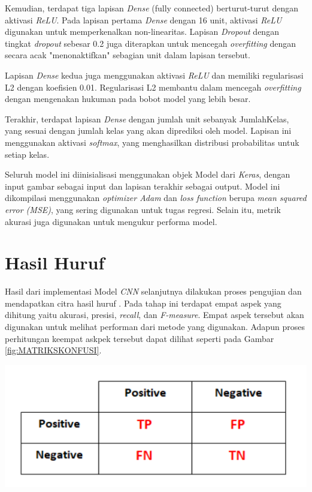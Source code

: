 Kemudian, terdapat tiga lapisan \textit{Dense} (fully connected) berturut-turut dengan aktivasi \textit{ReLU}. Pada lapisan pertama \textit{Dense} dengan 16 unit, aktivasi \textit{ReLU} digunakan untuk memperkenalkan non-linearitas. Lapisan \textit{Dropout} dengan tingkat \textit{dropout} sebesar 0.2 juga diterapkan untuk mencegah \textit{overfitting} dengan secara acak "menonaktifkan" sebagian unit dalam lapisan tersebut.

Lapisan \textit{Dense} kedua juga menggunakan aktivasi \textit{ReLU} dan memiliki regularisasi L2 dengan koefisien 0.01. Regularisasi L2 membantu dalam mencegah \textit{overfitting} dengan mengenakan hukuman pada bobot model yang lebih besar.

Terakhir, terdapat lapisan \textit{Dense} dengan jumlah unit sebanyak JumlahKelas, yang sesuai dengan jumlah kelas yang akan diprediksi oleh model. Lapisan ini menggunakan aktivasi \textit{softmax}, yang menghasilkan distribusi probabilitas untuk setiap kelas.

Seluruh model ini diinisialisasi menggunakan objek Model dari \textit{Keras}, dengan input gambar sebagai input dan lapisan terakhir sebagai output. Model ini dikompilasi menggunakan \textit{optimizer Adam} dan \textit{loss function} berupa\textit{ mean squared error (MSE)}, yang sering digunakan untuk tugas regresi. Selain itu, metrik akurasi juga digunakan untuk mengukur performa model.

\section{Hasil Huruf}
Hasil dari implementasi Model \textit{CNN} selanjutnya dilakukan proses pengujian dan mendapatkan citra hasil huruf . Pada tahap ini terdapat empat aspek yang dihitung yaitu akurasi, presisi, \textit{recall}, dan \emph {F-measure}. Empat aspek tersebut akan digunakan untuk melihat performan dari metode yang digunakan. Adapun proses perhitungan keempat askpek tersebut dapat dilihat seperti pada Gambar \ref{fig:MATRIKSKONFUSI}.
\begin{center}
	\includegraphics[width=0.7\linewidth]{gambar/bener/Nilai-Konfusi-Matriks.png}
	\label{fig:MATRIKSKONFUSI}
\end{center}


